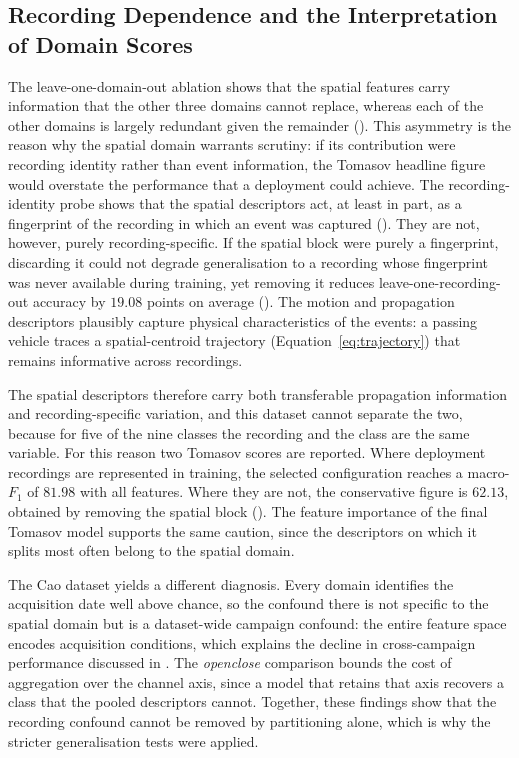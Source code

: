 \subsection{Recording Dependence and the Interpretation of Domain Scores}
\label{sec:resDiscRecording}
The leave-one-domain-out ablation shows that the spatial features carry information that the other three domains cannot replace, whereas each of the other domains is largely redundant given the remainder (). This asymmetry is the reason why the spatial domain warrants scrutiny: if its contribution were recording identity rather than event information, the Tomasov headline figure would overstate the performance that a deployment could achieve. The recording-identity probe shows that the spatial descriptors act, at least in part, as a fingerprint of the recording in which an event was captured (). They are not, however, purely recording-specific. If the spatial block were purely a fingerprint, discarding it could not degrade generalisation to a recording whose fingerprint was never available during training, yet removing it reduces leave-one-recording-out accuracy by $19.08$ points on average (). The motion and propagation descriptors plausibly capture physical characteristics of the events: a passing vehicle traces a spatial-centroid trajectory (Equation~\eqref{eq:trajectory}) that remains informative across recordings.

The spatial descriptors therefore carry both transferable propagation information and recording-specific variation, and this dataset cannot separate the two, because for five of the nine classes the recording and the class are the same variable. For this reason two Tomasov scores are reported. Where deployment recordings are represented in training, the selected configuration reaches a macro-$F_1$ of $81.98$ with all features. Where they are not, the conservative figure is $62.13$, obtained by removing the spatial block (). The feature importance of the final Tomasov model supports the same caution, since the descriptors on which it splits most often belong to the spatial domain.

The Cao dataset yields a different diagnosis. Every domain identifies the acquisition date well above chance, so the confound there is not specific to the spatial domain but is a dataset-wide campaign confound: the entire feature space encodes acquisition conditions, which explains the decline in cross-campaign performance discussed in . The \emph{openclose} comparison bounds the cost of aggregation over the channel axis, since a model that retains that axis recovers a class that the pooled descriptors cannot. Together, these findings show that the recording confound cannot be removed by partitioning alone, which is why the stricter generalisation tests were applied.

